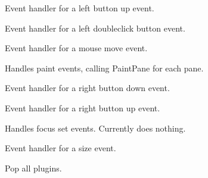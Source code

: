 
Event handler for a left button up event.


\label{wxframelayoutonldblclick}


Event handler for a left doubleclick button event.


\label{wxframelayoutonmousemove}


Event handler for a mouse move event.


\label{wxframelayoutonpaint}


Handles paint events, calling PaintPane for each pane.


\label{wxframelayoutonrbuttondown}


Event handler for a right button down event.


\label{wxframelayoutonrbuttonup}


Event handler for a right button up event.


\label{wxframelayoutonsetfocus}


Handles focus set events. Currently does nothing.


\label{wxframelayoutonsize}


Event handler for a size event.


\label{wxframelayoutpopallplugins}


Pop all plugins.


\label{wxframelayoutpopplugin}

